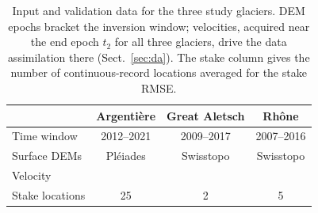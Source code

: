 \begin{table}
  \caption{Input and validation data for the three study glaciers. DEM epochs
    bracket the inversion window; velocities, acquired near the end epoch $t_2$ for
    all three glaciers, drive the data assimilation there (Sect.~\ref{sec:da}). The
    stake column gives the number of continuous-record locations averaged for the
    stake RMSE.}
  \label{tab:data}
  \centering
  \begin{tabular}{lccc}
    \toprule
     & Argentière & Great Aletsch & Rhône \\
    \midrule
    Time window            & 2012--2021 & 2009--2017 & 2007--2016 \\
    Surface DEMs      & Pléiades & Swisstopo & Swisstopo \\
    Velocity          & \multicolumn{3}{c}{\citep{millan2022}} \\
    Stake locations   & 25         & 2         & 5          \\
    \bottomrule
  \end{tabular}
\end{table}
